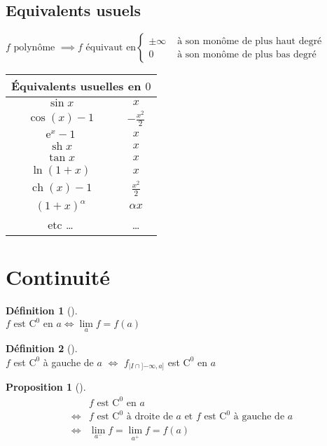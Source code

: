 \documentclass{article}
\newcommand{\et}{\text{ et }}
\newcommand{\lm}{\lim\limits}
\newcommand{\ex}{\mathrm{e}}
\newcommand{\co}[1]{\mathrm{C^{#1}}}
\newcommand{\en}{\text{ en }}
\newcommand{\est}{\text{ est }}
\newcommand{\drt}{\text{ à droite de }}
\newcommand{\gch}{\text{ à gauche de }}
\DeclareMathOperator{\ch}{ch}
\DeclareMathOperator{\sh}{sh}
\theoremstyle{definition}
\newtheorem*{prop}{Proposition}
\newtheorem*{defin}{Définition}
\theoremstyle{remark}
\theoremstyle{plain}
\newenvironment{prp}[1][]
{\begin{prop}[#1]\quad\\}
{\end{prop}}
\newenvironment{dfn}[1][]
{\begin{defin}[#1]\quad\\}
{\end{defin}}
\begin{document}
\subsection{Equivalents usuels}
$
f \text{ polynôme } \implies
f \text{ équivaut en}
\begin{cases}
\pm \infty  &\text{ à son monôme de plus haut degré} \\
0           &\text{ à son monôme de plus bas degré}
\end{cases}
$

\begin{tabular}{|c|c|}
\hline
\multicolumn{2}{|c|}{\'Equivalents usuelles en $0$} \\
\hline
$\sin x$ & $x$ \\
\hline
$\cos(x) - 1$ & $-\frac{x^2}{2}$ \\
\hline
$\ex^x - 1$ & $x$ \\
\hline
$\sh x $ & $x$ \\
\hline
$\tan x $ & $x$ \\
\hline
$\ln(1 + x)$ & $x$ \\
\hline
$\ch(x) - 1$ & $\frac{x^2}{2}$ \\
\hline
$(1 + x)^\alpha$ & $\alpha x$ \\
\hline
etc \ldots & \ldots \\
\hline
\end{tabular}

\section{Continuité}

\begin{dfn}
$f \text{ est } \co{0} \text{ en } a \iff \lm_a f = f(a)$
\end{dfn}

\begin{dfn}
$f$ est $\co{0}$ à gauche de $a$ $\iff$ $f_{|I\cap{]{-\infty},a]}}$ est
$\co{0}$ en $a$
\end{dfn}

\begin{prp}
\begin{align*}
    & f \est \co{0} \en a \\
\iff& f \est \co{0} \drt a \et f \est \co{0} \gch a \\
\iff& \lm_{a^-} f = \lm_{a^+} f = f(a) \\
\end{align*}
\end{prp}
\end{document}

